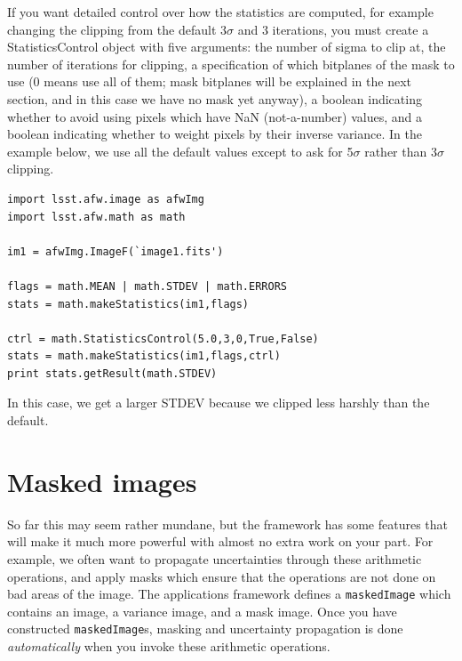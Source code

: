 If you want detailed control over how the statistics are computed, for
example changing the clipping from the default 3$\sigma$ and 3
iterations, you must create a StatisticsControl object with five
arguments: the number of sigma to clip at, the number of iterations
for clipping, a specification of which bitplanes of the mask to use (0
means use all of them; mask bitplanes will be explained in the next
section, and in this case we have no mask yet anyway), a boolean
indicating whether to avoid using pixels which have NaN (not-a-number)
values, and a boolean indicating whether to weight pixels by their
inverse variance.  In the example below, we use all the default values
except to ask for 5$\sigma$ rather than 3$\sigma$ clipping.

\begin{verbatim}
import lsst.afw.image as afwImg
import lsst.afw.math as math

im1 = afwImg.ImageF(`image1.fits')

flags = math.MEAN | math.STDEV | math.ERRORS 
stats = math.makeStatistics(im1,flags)

ctrl = math.StatisticsControl(5.0,3,0,True,False)
stats = math.makeStatistics(im1,flags,ctrl)
print stats.getResult(math.STDEV) 
\end{verbatim}

In this case, we get a larger STDEV because we clipped less harshly
than the default.


\section{Masked images}

So far this may seem rather mundane, but the framework has some
features that will make it much more powerful with almost no extra
work on your part.  For example, we often want to propagate
uncertainties through these arithmetic operations, and apply masks
which ensure that the operations are not done on bad areas of the
image.  The applications framework defines a \texttt{maskedImage}
which contains an image, a variance image, and a mask image.
Once you have constructed \texttt{maskedImage}s, masking and
uncertainty propagation is done {\it automatically} when you invoke
these arithmetic operations.

